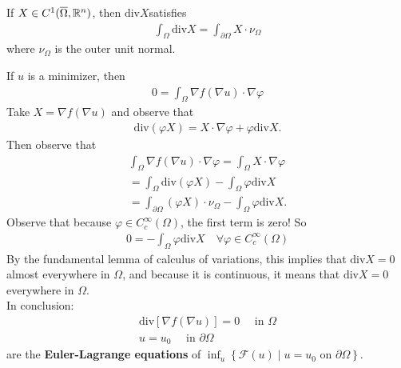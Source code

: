 \documentclass{memoir}
\begin{document}
\begin{thm}
	If \(X \in C^{1}(\overline{\Omega },\mathbb{R}^{n})\), then \(\textrm{div}X\)\footnotemark satisfies
	\begin{align*}
		\int_{\Omega } \textrm{div} X = \int_{\partial \Omega }X\cdot \nu_{\Omega }
	\end{align*}
	where \(\nu_{\Omega }\) is the outer unit normal.
\end{thm}
If \(u\) is a minimizer, then
\begin{align*}
	0 = \int_\Omega \nabla f(\nabla u) \cdot \nabla \varphi
\end{align*}
Take \(X = \nabla f(\nabla u)\) and observe that
\begin{align*}
	\textrm{div}(\varphi X) = X\cdot \nabla \varphi + \varphi \textrm{div}X.
\end{align*}
Then observe that
\begin{align*}
	\int_\Omega \nabla f (\nabla u) \cdot \nabla \varphi =\int_\Omega X \cdot \nabla \varphi\\
	= \int_\Omega \textrm{div}(\varphi X) - \int_\Omega \varphi \textrm{div}X\\
	= \int_{\partial \Omega }(\varphi X)\cdot \nu_\Omega - \int_\Omega \varphi \textrm{div}X.
\end{align*}
Observe that because \(\varphi \in C^{\infty}_c(\Omega )\), the first term is zero! So
\begin{align*}
	0 = - \int_\Omega \varphi \textrm{div}X \quad \forall \varphi \in C^{\infty}_c(\Omega )
\end{align*}
By the fundamental lemma of calculus of variations, this implies that \(\textrm{div}X = 0\) almost everywhere in \(\Omega \), and because it is continuous, it means that \(\textrm{div}X = 0\) everywhere in \(\Omega \).\\

In conclusion:
\begin{align*}
	\textrm{div}\left[ \nabla f(\nabla u) \right] = 0 \quad \text{ in }\Omega \\
	u = u_0 \quad \text{ in }\partial\Omega 
\end{align*}
are the \textbf{Euler-Lagrange equations} of \(\inf_{u} \left\{ \mathcal{F}(u) \mid u = u_{0} \text{ on }\partial \Omega  \right\} \).
\end{document}
